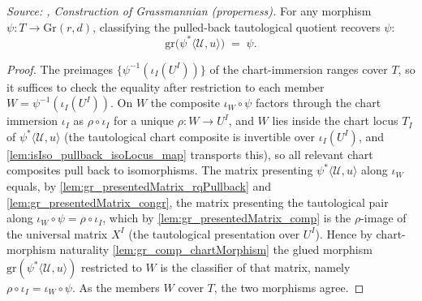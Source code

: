 \begin{lemma}\leanok
  \label{lem:gr_grPointOfRankQuotient_rqPullback_tautological}
  \textit{Source: \cite{nitsure-hilbert-quot}, Construction of Grassmannian (properness).}
  For any morphism \(\psi : T \to \mathrm{Gr}(r,d)\), classifying the pulled-back tautological
  quotient recovers \(\psi\):
  \[
    \mathrm{gr}\bigl(\psi^{*}\langle \mathcal{U}, u\rangle\bigr) \;=\; \psi .
  \]
\end{lemma}
\begin{proof}
  The preimages \(\{\psi^{-1}(\iota_I(U^I))\}\) of the chart-immersion ranges cover \(T\), so
  it suffices to check the equality after restriction to each member \(W = \psi^{-1}
  (\iota_I(U^I))\). On \(W\) the composite \(\iota_W\circ\psi\) factors through the chart
  immersion \(\iota_I\) as \(\rho\circ\iota_I\) for a unique \(\rho : W \to U^I\), and \(W\)
  lies inside the chart locus \(T_I\) of \(\psi^{*}\langle\mathcal{U},u\rangle\) (the
  tautological chart composite is invertible over \(\iota_I(U^I)\), and
  \cref{lem:isIso_pullback_isoLocus_map} transports this), so all relevant chart composites
  pull back to isomorphisms. The matrix presenting \(\psi^{*}\langle\mathcal{U},u\rangle\)
  along \(\iota_W\) equals, by \cref{lem:gr_presentedMatrix_rqPullback} and
  \cref{lem:gr_presentedMatrix_congr}, the matrix presenting the tautological pair along
  \(\iota_W\circ\psi = \rho\circ\iota_I\), which by \cref{lem:gr_presentedMatrix_comp} is the
  \(\rho\)-image of the universal matrix \(X^I\) (the tautological presentation over \(U^I\)).
  Hence by chart-morphism naturality \cref{lem:gr_comp_chartMorphism} the glued morphism
  \(\mathrm{gr}(\psi^{*}\langle\mathcal{U},u\rangle)\) restricted to \(W\) is the classifier of
  that matrix, namely \(\rho\circ\iota_I = \iota_W\circ\psi\). As the members \(W\) cover
  \(T\), the two morphisms agree.
\end{proof}

